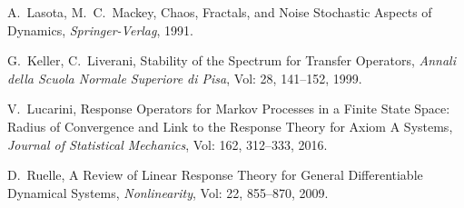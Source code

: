 \begin{thebibliography}{9999}

A.~Lasota, M.~C.~Mackey, Chaos, Fractals, and Noise Stochastic Aspects of Dynamics, \emph{Springer-Verlag}, 1991.

G.~Keller, C.~Liverani, Stability of the Spectrum for Transfer Operators, \emph{Annali della Scuola Normale Superiore di Pisa}, Vol: 28, 141--152, 1999.

V.~Lucarini, Response Operators for Markov Processes in a Finite State Space: Radius of Convergence and Link to the Response Theory for Axiom A Systems, \emph{Journal of Statistical Mechanics}, Vol: 162, 312--333, 2016.

D.~Ruelle, A Review of Linear Response Theory for General Differentiable Dynamical Systems, \emph{Nonlinearity}, Vol: 22, 855--870, 2009.


\end{thebibliography} 